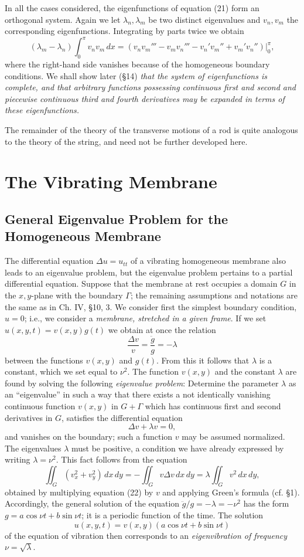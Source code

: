 In all the cases considered, the eigenfunctions of equation (21) form an orthogonal system. Again we let $\lambda_n,\lambda_m$ be two distinct eigenvalues and $v_n,v_m$ the corresponding eigenfunctions. Integrating by parts twice we obtain
\[
(\lambda_m-\lambda_n)\int_0^\pi v_nv_m\,dx
=\left(v_nv_m'''-v_mv_n'''-v_n'v_m''+v_m'v_n''\right)\Big|_0^\pi,
\]
where the right-hand side vanishes because of the homogeneous boundary conditions. We shall show later (\S14) \emph{that the system of eigenfunctions is complete, and that arbitrary functions possessing continuous first and second and piecewise continuous third and fourth derivatives may be expanded in terms of these eigenfunctions.}

The remainder of the theory of the transverse motions of a rod is quite analogous to the theory of the string, and need not be further developed here.

\section{The Vibrating Membrane}
\subsection{General Eigenvalue Problem for the Homogeneous Membrane}
The differential equation $\Delta u=u_{tt}$ of a vibrating homogeneous membrane also leads to an eigenvalue problem, but the eigenvalue problem pertains to a partial differential equation. Suppose that the membrane at rest occupies a domain $G$ in the $x,y$-plane with the boundary $\Gamma$; the remaining assumptions and notations are the same as in Ch. IV, \S10, 3. We consider first the simplest boundary condition, $u=0$; i.e., we consider a \emph{membrane, stretched in a given frame}. If we set $u(x,y,t)=v(x,y)g(t)$ we obtain at once the relation
\[
\frac{\Delta v}{v}=\frac{\ddot g}{g}=-\lambda
\]
between the functions $v(x,y)$ and $g(t)$. From this it follows that $\lambda$ is a constant, which we set equal to $\nu^2$. The function $v(x,y)$ and the constant $\lambda$ are found by solving the following \emph{eigenvalue problem}: Determine the parameter $\lambda$ as an ``eigenvalue'' in such a way that there exists a not identically vanishing continuous function $v(x,y)$ in $G+\Gamma$ which has continuous first and second derivatives in $G$, satisfies the differential equation
\begin{equation}\tag{22}
\Delta v+\lambda v=0,
\end{equation}
and vanishes on the boundary; such a function $v$ may be assumed normalized. The eigenvalues $\lambda$ must be positive, a condition we have already expressed by writing $\lambda=\nu^2$. This fact follows from the equation
\[
\iint_G(v_x^2+v_y^2)\,dx\,dy
=-\iint_Gv\Delta v\,dx\,dy
=\lambda\iint_Gv^2\,dx\,dy,
\]
obtained by multiplying equation (22) by $v$ and applying Green's formula (cf. \S1). Accordingly, the general solution of the equation $\ddot g/g=-\lambda=-\nu^2$ has the form $g=a\cos\nu t+b\sin\nu t$; it is a periodic function of the time. The solution
\[
u(x,y,t)=v(x,y)(a\cos\nu t+b\sin\nu t)
\]
of the equation of vibration then corresponds to an \emph{eigenvibration of frequency $\nu=\sqrt\lambda$}.


